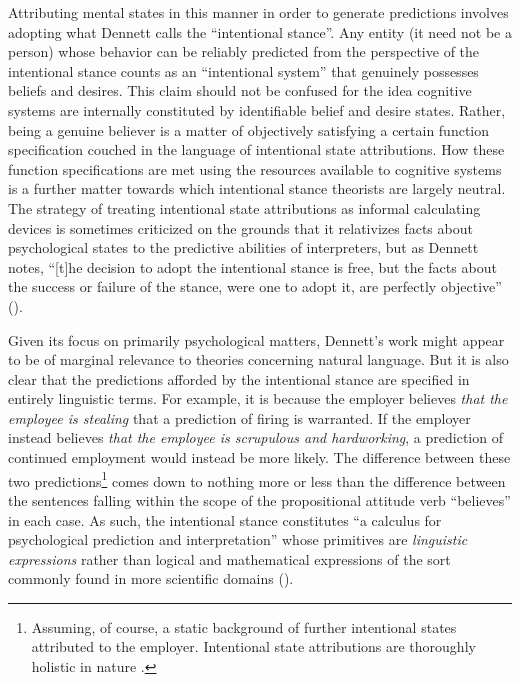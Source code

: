 Attributing mental states in this manner in order to generate predictions involves adopting what Dennett calls the ``intentional stance''. Any entity (it need not be a person) whose behavior can be reliably predicted from the perspective of the intentional stance counts as an ``intentional system'' that genuinely possesses beliefs and desires. This claim should not be confused for the idea cognitive systems are internally constituted by identifiable belief and desire states. Rather, being a genuine believer is a matter of objectively satisfying a certain function specification couched in the language of intentional state attributions. How these function specifications are met using the resources available to cognitive systems is a further matter towards which intentional stance theorists are largely neutral. The strategy of treating intentional state attributions as informal calculating devices is sometimes criticized on the grounds that it relativizes facts about psychological states to the predictive abilities of interpreters, but as Dennett notes, ``[t]he decision to adopt the intentional stance is free, but the facts about the success or failure of the stance, were one to adopt it, are perfectly objective'' (\citeyear[][p. 24]{Dennett:1987}).

Given its focus on primarily psychological matters, Dennett's work might appear to be of marginal relevance to theories concerning natural language. But it is also clear that the predictions afforded by the intentional stance are specified in entirely linguistic terms. For example, it is because the employer believes \textit{that the employee is stealing} that a prediction of firing is warranted. If the employer instead believes \textit{that the employee is scrupulous and hardworking}, a prediction of continued employment would instead be more likely. The difference between these two predictions\footnote{Assuming, of course, a static background of further intentional states attributed to the employer. Intentional state attributions are thoroughly holistic in nature \citep{Dennett:1987}.} comes down to nothing more or less than the difference between the sentences falling within the scope of the propositional attitude verb ``believes'' in each case. As such, the intentional stance constitutes ``a calculus for psychological prediction and interpretation'' whose primitives are \textit{linguistic expressions} rather than logical and mathematical expressions of the sort commonly found in more scientific domains (\citeyear[][p. 58]{Dennett:1987}).

